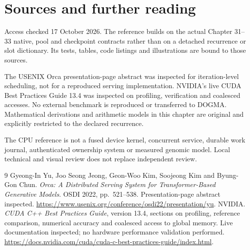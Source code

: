 \chapter*{Sources and further reading}
Access checked 17 October 2026. The reference builds on the actual Chapter 31--33 native, pool and checkpoint contracts rather than on a detached recurrence or slot dictionary. Its tests, tables, code listings and illustrations are bound to those sources.

The USENIX Orca presentation-page abstract was inspected for iteration-level
scheduling, not for a reproduced serving implementation. NVIDIA's live
CUDA Best Practices Guide 13.4 was inspected on profiling, verification and
coalesced accesses. No external benchmark is reproduced or transferred to
DOGMA. Mathematical derivations and arithmetic models in this chapter are
original and explicitly restricted to the declared recurrence.

The CPU reference is not a fused device kernel, concurrent service, durable
work journal, authenticated ownership system or measured genomic model.
Local technical and visual review does not replace independent review.
\begin{thebibliography}{9}
 Gyeong-In Yu, Joo Seong Jeong, Geon-Woo Kim, Soojeong Kim
and Byung-Gon Chun. \emph{Orca: A Distributed Serving System for
Transformer-Based Generative Models}. OSDI 2022, pp.\ 521--538.
Presentation-page abstract inspected.
\url{https://www.usenix.org/conference/osdi22/presentation/yu}.
 NVIDIA. \emph{CUDA C++ Best Practices Guide}, version 13.4,
sections on profiling, reference comparison, numerical accuracy and
coalesced access to global memory. Live documentation inspected; no
hardware performance validation performed.
\url{https://docs.nvidia.com/cuda/cuda-c-best-practices-guide/index.html}.
\end{thebibliography}
